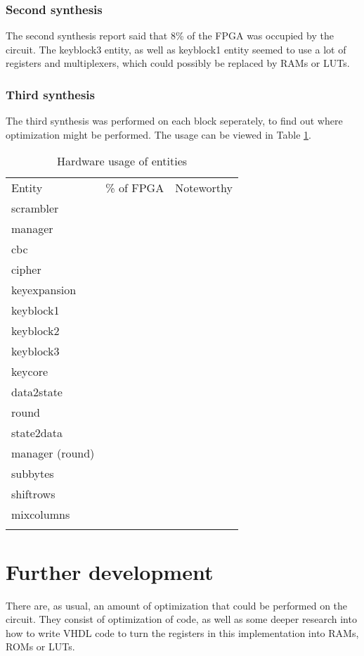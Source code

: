 \subsubsection{Second synthesis}
The second synthesis report said that 8\% of the FPGA was occupied by 
the circuit. The keyblock3 entity, as well as keyblock1 entity seemed 
to use a lot of registers and multiplexers, which could possibly be 
replaced by RAMs or LUTs.

\subsubsection{Third synthesis}
The third synthesis was performed on each block seperately, to find out
where optimization might be performed. The usage can be viewed in Table 
\ref{synt:third}.

\begin{longtable}{ l | c | c }
  Entity & \% of FPGA & Noteworthy \\
  scrambler & & \\
  manager & & \\
  cbc & & \\
  cipher & & \\
  keyexpansion & & \\
  keyblock1 & & \\
  keyblock2 & & \\
  keyblock3 & & \\
  keycore & & \\
  data2state & & \\
  round & & \\
  state2data & & \\
  manager (round) & & \\
  subbytes & & \\
  shiftrows & & \\
  mixcolumns & & \\
  \caption{Hardware usage of entities}
  \label{synt:third}
\end{longtable}

\section{Further development}
There are, as usual, an amount of optimization that could be performed 
on the circuit. They consist of optimization of code, as well as some 
deeper research into how to write VHDL code to turn the registers in 
this implementation into RAMs, ROMs or LUTs.

